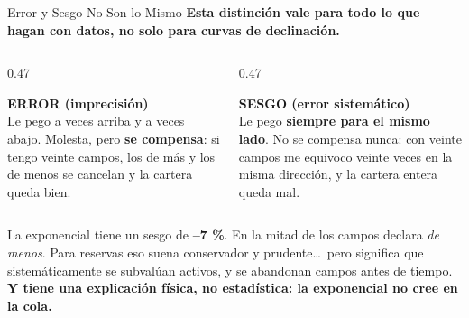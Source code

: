 \documentclass[aspectratio=169, 11pt]{beamer}
\begin{document}
\begin{frame}[shrink=16]{Error y Sesgo No Son lo Mismo}
  \vspace{-4pt}
  {\small\color{arcaDark}\bfseries
   Esta distinción vale para todo lo que hagan con datos, no solo para
   curvas de declinación.}
  \vspace{9pt}
  \begin{columns}[T]
    \begin{column}{0.47\textwidth}
      \begin{tcolorbox}[colback=arcaGray, colframe=codeBlue, boxrule=0pt, leftrule=3pt,
        arc=3pt, left=6pt, right=6pt, top=5pt, bottom=5pt]
        {\scriptsize\color{codeBlue}\bfseries\faBullseye\hspace{4pt}ERROR (imprecisión)}\\[4pt]
        {\scriptsize\color{textMuted}
         Le pego a veces arriba y a veces abajo. Molesta, pero
         \textbf{se compensa}: si tengo veinte campos, los de más y los de
         menos se cancelan y la cartera queda bien.}
      \end{tcolorbox}
    \end{column}
    \begin{column}{0.47\textwidth}
      \begin{tcolorbox}[colback=arcaGray, colframe=arcaRed, boxrule=0pt, leftrule=3pt,
        arc=3pt, left=6pt, right=6pt, top=5pt, bottom=5pt]
        {\scriptsize\color{arcaRed}\bfseries\faExclamationTriangle\hspace{4pt}SESGO (error sistemático)}\\[4pt]
        {\scriptsize\color{textMuted}
         Le pego \textbf{siempre para el mismo lado}. No se compensa nunca:
         con veinte campos me equivoco veinte veces en la misma dirección, y
         la cartera entera queda mal.}
      \end{tcolorbox}
    \end{column}
  \end{columns}
  \vspace{9pt}
  \begin{tcolorbox}[colback=arcaGray, colframe=arcaDark, boxrule=0pt, leftrule=3pt,
    arc=3pt, left=8pt, right=8pt, top=6pt, bottom=6pt]
    {\footnotesize\color{textMuted}
     La exponencial tiene un sesgo de \textbf{--7 \%}. En la mitad de los
     campos declara \emph{de menos}. Para reservas eso suena conservador y
     prudente\dots\ pero significa que sistemáticamente se subvalúan activos,
     y se abandonan campos antes de tiempo.\\[5pt]
     {\color{arcaDark}\bfseries Y tiene una explicación física, no estadística:
      la exponencial no cree en la cola.}}
  \end{tcolorbox}
\end{frame}
\end{document}
